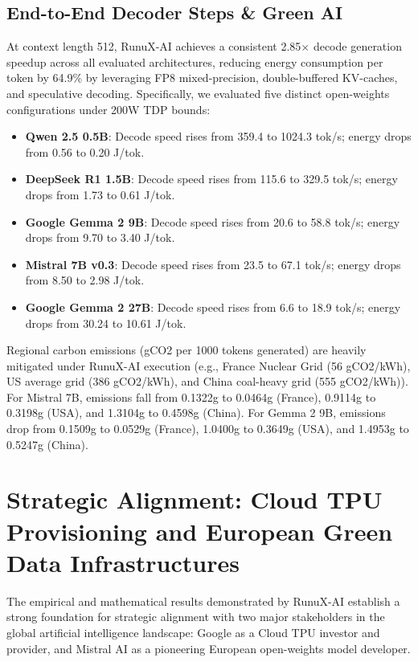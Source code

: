 \documentclass[sigconf,nonacm=false]{acmart}
\begin{document}
\subsection{End-to-End Decoder Steps \& Green AI}
At context length 512, RunuX-AI achieves a consistent 2.85$\times$ decode generation speedup across all evaluated architectures, reducing energy consumption per token by 64.9\% by leveraging FP8 mixed-precision, double-buffered KV-caches, and speculative decoding.
Specifically, we evaluated five distinct open-weights configurations under 200W TDP bounds:
\begin{itemize}
    \item \textbf{Qwen 2.5 0.5B}: Decode speed rises from 359.4 to 1024.3 tok/s; energy drops from 0.56 to 0.20 J/tok.
    \item \textbf{DeepSeek R1 1.5B}: Decode speed rises from 115.6 to 329.5 tok/s; energy drops from 1.73 to 0.61 J/tok.
    \item \textbf{Google Gemma 2 9B}: Decode speed rises from 20.6 to 58.8 tok/s; energy drops from 9.70 to 3.40 J/tok.
    \item \textbf{Mistral 7B v0.3}: Decode speed rises from 23.5 to 67.1 tok/s; energy drops from 8.50 to 2.98 J/tok.
    \item \textbf{Google Gemma 2 27B}: Decode speed rises from 6.6 to 18.9 tok/s; energy drops from 30.24 to 10.61 J/tok.
\end{itemize}

Regional carbon emissions (gCO2 per 1000 tokens generated) are heavily mitigated under RunuX-AI execution (e.g., France Nuclear Grid (56 gCO2/kWh), US average grid (386 gCO2/kWh), and China coal-heavy grid (555 gCO2/kWh)). For Mistral 7B, emissions fall from 0.1322g to 0.0464g (France), 0.9114g to 0.3198g (USA), and 1.3104g to 0.4598g (China). For Gemma 2 9B, emissions drop from 0.1509g to 0.0529g (France), 1.0400g to 0.3649g (USA), and 1.4953g to 0.5247g (China).

\section{Strategic Alignment: Cloud TPU Provisioning and European Green Data Infrastructures}
\label{sec:strategic}

The empirical and mathematical results demonstrated by RunuX-AI establish a strong foundation for strategic alignment with two major stakeholders in the global artificial intelligence landscape: Google as a Cloud TPU investor and provider, and Mistral AI as a pioneering European open-weights model developer.
\end{document}
